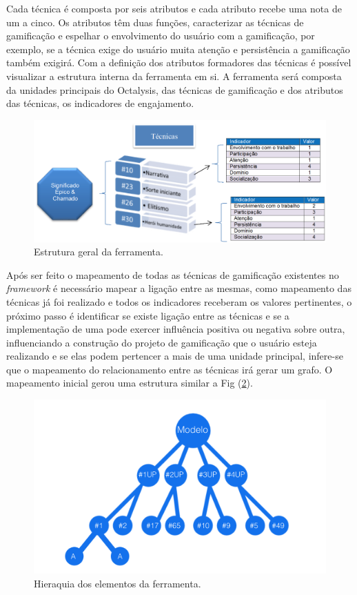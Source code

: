 Cada técnica é composta por seis atributos e cada atributo recebe uma nota de um a cinco. Os atributos têm duas funções, caracterizar as técnicas de gamificação e espelhar o envolvimento do usuário com a gamificação, por exemplo, se a técnica exige do usuário muita atenção e persistência a gamificação também exigirá. Com a definição dos atributos formadores das técnicas é possível visualizar a estrutura interna da ferramenta em si. A ferramenta será composta da unidades principais do Octalysis, das técnicas de gamificação e dos atributos das técnicas, os indicadores de engajamento. 


\begin{figure}[h]
	\centering
		\includegraphics[keepaspectratio=true,scale=0.25]{figuras/mapeamento.png}
	\caption{Estrutura geral da ferramenta.\label{fig03}
}
\end{figure}
\newpage


Após ser feito o mapeamento de todas as técnicas de gamificação existentes no \textit{framework} é necessário mapear a ligação entre as mesmas, como mapeamento das técnicas já foi realizado e todos os indicadores receberam os valores pertinentes, o próximo passo é identificar se existe ligação entre as técnicas e se a implementação de uma pode exercer influência positiva ou negativa sobre outra, influenciando a construção do projeto de gamificação que o usuário esteja realizando e se elas podem pertencer a mais de uma unidade principal, infere-se que o mapeamento do relacionamento entre as técnicas irá gerar um grafo. O mapeamento inicial gerou uma estrutura similar a Fig (\ref{fig04}).

\begin{figure}[h]
	\centering
		\includegraphics[keepaspectratio=true,scale=0.5]{figuras/hierarquia.png}
	\caption{Hieraquia dos elementos da ferramenta.	\label{fig04}}
\end{figure}

